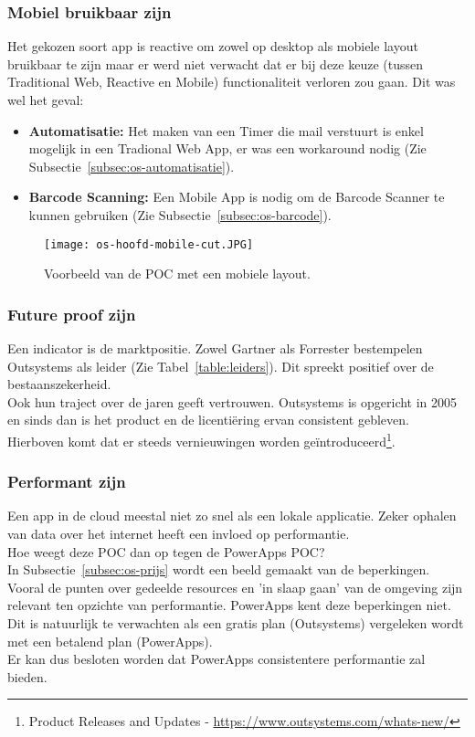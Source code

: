 \subsubsection{Mobiel bruikbaar zijn}

Het gekozen soort app is reactive om zowel op desktop als mobiele layout bruikbaar te zijn maar er werd niet verwacht dat er bij deze keuze (tussen Traditional Web, Reactive en Mobile) functionaliteit verloren zou gaan. Dit was wel het geval:
\begin{itemize}
    \item \textbf{Automatisatie:} Het maken van een Timer die mail verstuurt is enkel mogelijk in een Tradional Web App, er was een workaround nodig (Zie Subsectie~\ref{subsec:os-automatisatie}).
    \item \textbf{Barcode Scanning:} Een Mobile App is nodig om de Barcode Scanner te kunnen gebruiken (Zie Subsectie~\ref{subsec:os-barcode}).
\end{itemize}

\begin{figure}[h!]
    \centering
    \texttt{[image: os-hoofd-mobile-cut.JPG]}
    \caption{Voorbeeld van de POC met een mobiele layout.}
    \label{fig:os-hoofd-mobile}
\end{figure}

\subsubsection{Future proof zijn}

Een indicator is de marktpositie. Zowel Gartner als Forrester bestempelen Outsystems als leider (Zie Tabel~\ref{table:leiders}). Dit spreekt positief over de bestaanszekerheid.\\
Ook hun traject over de jaren geeft vertrouwen.
Outsystems is opgericht in 2005 en sinds dan is het product en de licentiëring ervan consistent gebleven.\\
Hierboven komt dat er steeds vernieuwingen worden geïntroduceerd\footnote{Product Releases and Updates - \url{https://www.outsystems.com/whats-new/}}.

\subsubsection{Performant zijn}

Een app in de cloud meestal niet zo snel als een lokale applicatie. Zeker ophalen van data over het internet heeft een invloed op performantie.\\
Hoe weegt deze POC dan op tegen de PowerApps POC?\\
In Subsectie~\ref{subsec:os-prijs} wordt een beeld gemaakt van de beperkingen. Vooral de punten over gedeelde resources en 'in slaap gaan' van de omgeving zijn relevant ten opzichte van performantie. PowerApps kent deze beperkingen niet. Dit is natuurlijk te verwachten als een gratis plan (Outsystems) vergeleken wordt met een betalend plan (PowerApps).\\
Er kan dus besloten worden dat PowerApps consistentere performantie zal bieden.

